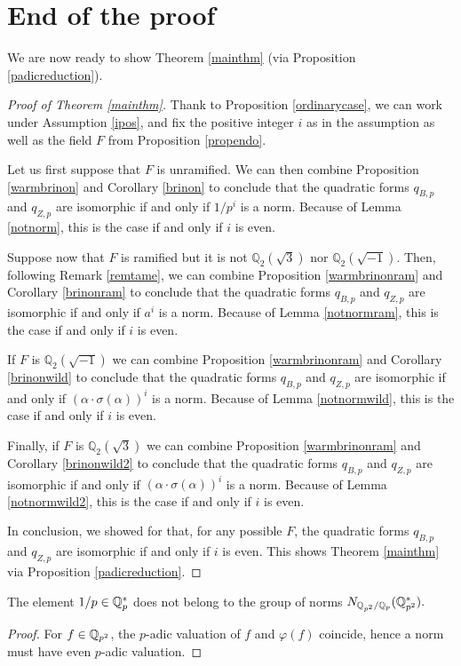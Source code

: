 \documentclass[11pt]{amsart}
\begin{document}
\section{End of the proof}\label{endpf}
We are now ready to show Theorem \ref{mainthm}  (via Proposition \ref{padicreduction}).  

\begin{proof}[Proof of Theorem \ref{mainthm}]
Thank to Proposition \ref{ordinarycase}, we can work under Assumption \ref{ipos}, and fix the positive integer $i$ as in the assumption as well as the field $F$ from Proposition \ref{propendo}.

Let us first suppose that  $F$ is unramified. We can then combine Proposition \ref{warmbrinon} and Corollary \ref{brinon} to conclude that the quadratic forms  $q_{B,p}$ and $q_{Z,p}$ are isomorphic if and only if $1/p^i$ is a norm. Because of Lemma \ref{notnorm}, this is the case   if and only if $i$ is even.


Suppose now that $F$ is ramified but it is not $\mathbb{Q}_2(\sqrt{3})$ nor $\mathbb{Q}_2(\sqrt{-1})$. Then, following  Remark \ref{remtame}, we can combine Proposition \ref{warmbrinonram} and Corollary \ref{brinonram} to conclude that the quadratic forms $q_{B,p}$ and $q_{Z,p}$ are isomorphic if and only if    $ a^i$ is a norm. Because of Lemma \ref{notnormram}, this is the case   if and only if $i$ is even.

If $F$ is  $\mathbb{Q}_2(\sqrt{-1})$ we can  combine Proposition \ref{warmbrinonram} and Corollary \ref{brinonwild} to conclude that the quadratic forms $q_{B,p}$ and $q_{Z,p}$ are isomorphic if and only if    $  (\alpha  \cdot \sigma(\alpha) )^i$ is a norm. Because of Lemma \ref{notnormwild}, this is the case   if and only if $i$ is even.

Finally, if $F$ is  $\mathbb{Q}_2(\sqrt{3})$ we can  combine Proposition \ref{warmbrinonram} and Corollary \ref{brinonwild2} to conclude that the quadratic forms  $q_{B,p}$ and $q_{Z,p}$ are isomorphic if and only if    $  (\alpha  \cdot \sigma(\alpha) )^i$ is a norm. Because of Lemma \ref{notnormwild2}, this is the case   if and only if $i$ is even.


In conclusion, we showed for that, for any possible $F$, the quadratic forms $q_{B,p}$ and $q_{Z,p}$ are isomorphic if and only if $i$ is even. This shows Theorem \ref{mainthm}  via Proposition \ref{padicreduction}.
\end{proof}


\begin{lemma}\label{notnorm}
The element $1/p\in \mathbb{Q}_p^*$ does not belong to the group of norms $ N_{\mathbb{Q}_{p^2}/\mathbb{Q}_p}(\mathbb{Q}^*_{p^2}).$
\end{lemma}
\begin{proof}
For $f\in \mathbb{Q}_{p^2}$,   the $p$-adic valuation of $f$ and $\varphi (f)$ coincide, hence a norm must have even $p$-adic valuation.
\end{proof}
\end{document}
